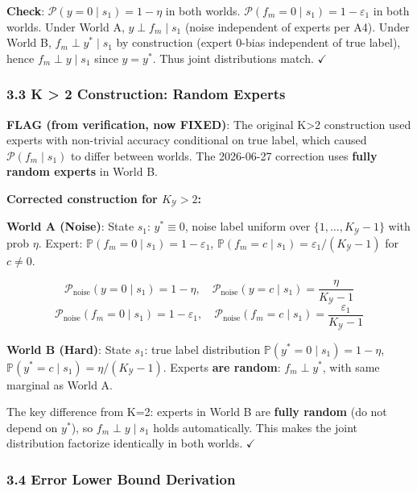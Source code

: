 \documentclass[
  12pt,
]{ctexart}
\begin{document}
\textbf{Check}: \(\mathcal{P}(y=0 \mid s_1) = 1-\eta\) in both worlds.
\(\mathcal{P}(f_m=0 \mid s_1) = 1-\varepsilon_1\) in both worlds. Under
World A, \(y \perp f_m \mid s_1\) (noise independent of experts per A4).
Under World B, \(f_m \perp y^* \mid s_1\) by construction (expert 0-bias
independent of true label), hence \(f_m \perp y \mid s_1\) since
\(y=y^*\). Thus joint distributions match. \(\checkmark\)

\subsubsection{3.3 K \textgreater{} 2 Construction: Random
Experts}\label{k-2-construction-random-experts}

\textbf{FLAG (from verification, now FIXED)}: The original
K\textgreater2 construction used experts with non-trivial accuracy
conditional on true label, which caused \(\mathcal{P}(f_m \mid s_1)\) to
differ between worlds. The 2026-06-27 correction uses \textbf{fully
random experts} in World B.

\textbf{Corrected construction for \(K_{\mathcal{Y}} > 2\):}

\textbf{World A (Noise)}: State \(s_1\): \(y^* \equiv 0\), noise label
uniform over \(\{1,\dots,K_{\mathcal{Y}}-1\}\) with prob \(\eta\).
Expert: \(\mathbb{P}(f_m=0 \mid s_1) = 1-\varepsilon_1\),
\(\mathbb{P}(f_m=c \mid s_1) = \varepsilon_1/(K_{\mathcal{Y}}-1)\) for
\(c \neq 0\).

\[\mathcal{P}_{\text{noise}}(y=0 \mid s_1) = 1-\eta, \quad \mathcal{P}_{\text{noise}}(y=c \mid s_1) = \frac{\eta}{K_{\mathcal{Y}}-1}\]
\[\mathcal{P}_{\text{noise}}(f_m=0 \mid s_1) = 1-\varepsilon_1, \quad \mathcal{P}_{\text{noise}}(f_m=c \mid s_1) = \frac{\varepsilon_1}{K_{\mathcal{Y}}-1}\]

\textbf{World B (Hard)}: State \(s_1\): true label distribution
\(\mathbb{P}(y^*=0 \mid s_1) = 1-\eta\),
\(\mathbb{P}(y^*=c \mid s_1) = \eta/(K_{\mathcal{Y}}-1)\). Experts
\textbf{are random}: \(f_m \perp y^*\), with same marginal as World A.

The key difference from K=2: experts in World B are \textbf{fully
random} (do not depend on \(y^*\)), so \(f_m \perp y \mid s_1\) holds
automatically. This makes the joint distribution factorize identically
in both worlds. \(\checkmark\)

\subsubsection{3.4 Error Lower Bound
Derivation}\label{error-lower-bound-derivation}
\end{document}

